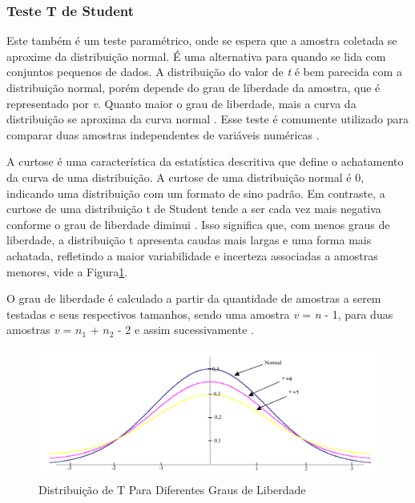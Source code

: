 \subsubsection{Teste T de Student}
\label{subsec:t-test}

Este também é um teste paramétrico, onde se espera que a amostra coletada se aproxime da distribuição normal. É uma alternativa para quando se lida com conjuntos pequenos de dados. A distribuição do valor de \textit{t} é bem parecida com a distribuição normal, porém depende do grau de liberdade da amostra, que é representado por \textit{v}. Quanto maior o grau de liberdade, mais a curva da distribuição se aproxima da curva normal \cite{juristo_basics_2001}. Esse teste é comumente utilizado para comparar duas amostras independentes de variáveis numéricas \cite{wohlin_experimentation_2012}.

A curtose é uma característica da estatística descritiva que define o achatamento da curva de uma distribuição. A curtose de uma distribuição normal é 0, indicando uma distribuição com um formato de sino padrão. Em contraste, a curtose de uma distribuição t de Student tende a ser cada vez mais negativa conforme o grau de liberdade diminui \cite{juristo_basics_2001}. Isso significa que, com menos graus de liberdade, a distribuição t apresenta caudas mais largas e uma forma mais achatada, refletindo a maior variabilidade e incerteza associadas a amostras menores, vide a Figura\ref{fig:t-statistic}.

O grau de liberdade é calculado a partir da quantidade de amostras a serem testadas e seus respectivos tamanhos, sendo uma amostra \textit{v} = \textit{n} - 1, para duas amostras \textit{v} = \textit{\(n_1\)} + \textit{\(n_2\)} - 2 e assim sucessivamente \cite{juristo_basics_2001}.



\begin{figure}
    \centering
    
    \caption{Distribuição de T Para Diferentes Graus de Liberdade}
    
    \includegraphics[width=1\linewidth]{figuras/t-statistic.png}
    
    
    \label{fig:t-statistic}
\end{figure}


